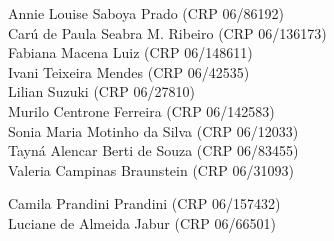 \begin{CreditoInstitucional}
    Annie Louise Saboya Prado (CRP 06/86192)\\
    Carú de Paula Seabra M. Ribeiro (CRP 06/136173)\\
    Fabiana Macena Luiz (CRP 06/148611)\\
    Ivani Teixeira Mendes (CRP 06/42535)\\
    Lilian Suzuki (CRP 06/27810)\\
    Murilo Centrone Ferreira (CRP 06/142583)\\
    Sonia Maria Motinho da Silva (CRP 06/12033)\\
    Tayná Alencar Berti de Souza (CRP 06/83455)\\
    Valeria Campinas Braunstein (CRP 06/31093)\\
\end{CreditoInstitucional}

\begin{CreditoInstitucional}
    Camila Prandini Prandini (CRP 06/157432)\\
    Luciane de Almeida Jabur (CRP 06/66501)\\
\end{CreditoInstitucional}